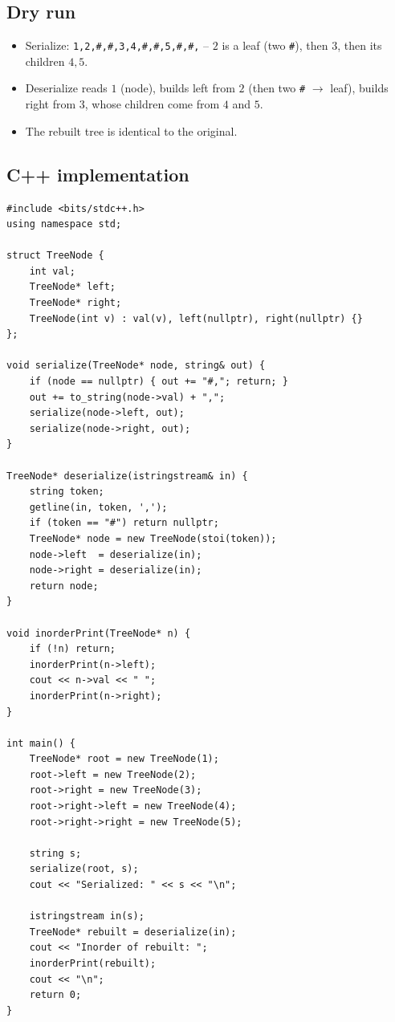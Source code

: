 \subsection*{Dry run}


\begin{itemize}
  \item Serialize: \verb|1,2,#,#,3,4,#,#,5,#,#,| -- $2$ is a leaf (two
        \verb|#|), then $3$, then its children $4,5$.
  \item Deserialize reads $1$ (node), builds left from $2$ (then two
        \verb|#| $\to$ leaf), builds right from $3$, whose children come
        from $4$ and $5$.
  \item The rebuilt tree is identical to the original.
\end{itemize}

\subsection*{C++ implementation}

\begin{lstlisting}
#include <bits/stdc++.h>
using namespace std;

struct TreeNode {
    int val;
    TreeNode* left;
    TreeNode* right;
    TreeNode(int v) : val(v), left(nullptr), right(nullptr) {}
};

void serialize(TreeNode* node, string& out) {
    if (node == nullptr) { out += "#,"; return; }
    out += to_string(node->val) + ",";
    serialize(node->left, out);
    serialize(node->right, out);
}

TreeNode* deserialize(istringstream& in) {
    string token;
    getline(in, token, ',');
    if (token == "#") return nullptr;
    TreeNode* node = new TreeNode(stoi(token));
    node->left  = deserialize(in);
    node->right = deserialize(in);
    return node;
}

void inorderPrint(TreeNode* n) {
    if (!n) return;
    inorderPrint(n->left);
    cout << n->val << " ";
    inorderPrint(n->right);
}

int main() {
    TreeNode* root = new TreeNode(1);
    root->left = new TreeNode(2);
    root->right = new TreeNode(3);
    root->right->left = new TreeNode(4);
    root->right->right = new TreeNode(5);

    string s;
    serialize(root, s);
    cout << "Serialized: " << s << "\n";

    istringstream in(s);
    TreeNode* rebuilt = deserialize(in);
    cout << "Inorder of rebuilt: ";
    inorderPrint(rebuilt);
    cout << "\n";
    return 0;
}
\end{lstlisting}

